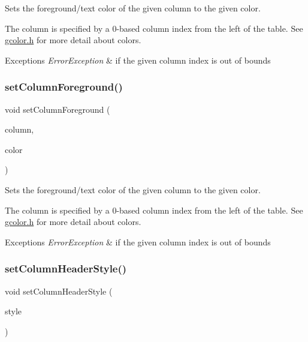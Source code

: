 Sets the foreground/text color of the given column to the given color. 

The column is specified by a 0-\/based column index from the left of the table. See \mbox{\hyperlink{gcolor_8h_source}{gcolor.\+h}} for more detail about colors. 
\begin{DoxyExceptions}{Exceptions}
{\em Error\+Exception} & if the given column index is out of bounds \\
\hline
\end{DoxyExceptions}
\mbox{\label{classsgl_1_1GTable_a84ca08c2995646ab28c78bffbcdc2693}} 
\subsubsection{\texorpdfstring{set\+Column\+Foreground()}{setColumnForeground()}\hspace{0.1cm}{\footnotesize\ttfamily [2/2]}}
{\footnotesize\ttfamily void set\+Column\+Foreground (\begin{DoxyParamCaption}\item[{int}]{column,  }\item[{const std\+::string \&}]{color }\end{DoxyParamCaption})\hspace{0.3cm}{\ttfamily [virtual]}}



Sets the foreground/text color of the given column to the given color. 

The column is specified by a 0-\/based column index from the left of the table. See \mbox{\hyperlink{gcolor_8h_source}{gcolor.\+h}} for more detail about colors. 
\begin{DoxyExceptions}{Exceptions}
{\em Error\+Exception} & if the given column index is out of bounds \\
\hline
\end{DoxyExceptions}
\mbox{\label{classsgl_1_1GTable_ac97cb91256925fa81c52594bca854969}} 
\subsubsection{\texorpdfstring{set\+Column\+Header\+Style()}{setColumnHeaderStyle()}}
{\footnotesize\ttfamily void set\+Column\+Header\+Style (\begin{DoxyParamCaption}\item[{\mbox{\hyperlink{classsgl_1_1GTable_a060cff504451bbb98530e64e936e2671}{G\+Table\+::\+Column\+Header\+Style}}}]{style }\end{DoxyParamCaption})\hspace{0.3cm}{\ttfamily [virtual]}}



